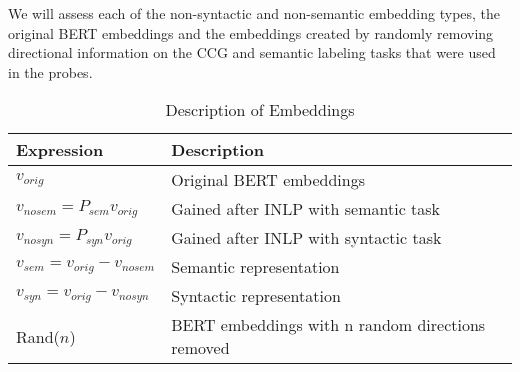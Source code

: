 \documentclass[11pt,a4paper]{article}
\begin{document}
We will assess each of the non-syntactic and non-semantic embedding types, the original BERT embeddings and the embeddings created by randomly removing directional information on the CCG and semantic labeling tasks that were used in the probes. 



\begin{table}[ht]
    \centering
    \begin{tabular}{p{4cm}p{3cm}}\hline
        \textbf{Expression} & \textbf{Description}\\ \hline 
        $v_{orig}$ & Original BERT embeddings  \\
        $v_{nosem} = P_{sem} v_{orig}$ & Gained after INLP with semantic task \\
        $v_{nosyn}= P_{syn} v_{orig}$ & Gained after INLP with syntactic task \\
        $v_{sem} = v_{orig}-v_{nosem}$ & Semantic representation \\
        $v_{syn} = v_{orig}-v_{nosyn}$ & Syntactic representation \\
        Rand($n$) & BERT embeddings with n random directions removed \\

        
        
        \hline
    \end{tabular}
    \caption{\label{description} Description of Embeddings
    }
\end{table}
\end{document}
